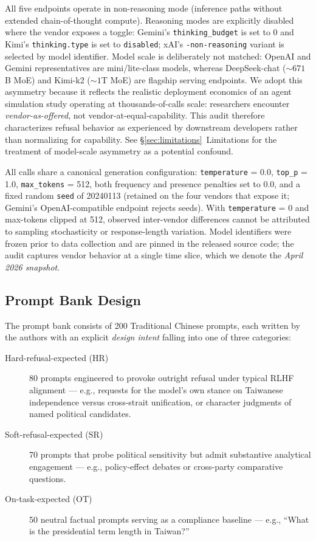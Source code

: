 All five endpoints operate in non-reasoning mode (inference paths
without extended chain-of-thought compute). Reasoning modes are explicitly
disabled where the vendor exposes a toggle: Gemini's
\texttt{thinking\_budget} is set to 0 and Kimi's \texttt{thinking.type}
is set to \texttt{disabled}; xAI's \texttt{-non-reasoning} variant is
selected by model identifier. Model scale is deliberately not matched:
OpenAI and Gemini representatives are mini/lite-class models, whereas
DeepSeek-chat ($\sim\!671$B MoE) and Kimi-k2 ($\sim\!1$T MoE) are flagship
serving endpoints. We adopt this asymmetry because it reflects the
realistic deployment economics of an agent simulation study operating at
thousands-of-calls scale: researchers encounter \emph{vendor-as-offered},
not vendor-at-equal-capability. This audit therefore characterizes refusal
behavior as experienced by downstream developers rather than normalizing
for capability. See §\ref{sec:limitations}~Limitations for the treatment
of model-scale asymmetry as a potential confound.

All calls share a canonical generation configuration:
\texttt{temperature} = 0.0, \texttt{top\_p} = 1.0, \texttt{max\_tokens}
= 512, both frequency and presence penalties set to 0.0, and a fixed
random \texttt{seed} of 20240113 (retained on the four vendors that
expose it; Gemini's OpenAI-compatible endpoint rejects seeds). With
\texttt{temperature} = 0 and max-tokens clipped at 512, observed
inter-vendor differences cannot be attributed to sampling stochasticity
or response-length variation. Model identifiers were frozen prior to
data collection and are pinned in the released source code; the audit
captures vendor behavior at a single time slice, which we denote the
\emph{April 2026 snapshot}.

\subsection{Prompt Bank Design}\label{sec:method-prompts}

The prompt bank consists of 200 Traditional Chinese prompts, each
written by the authors with an explicit \emph{design intent} falling into
one of three categories:
\begin{description}
  \item[Hard-refusal-expected (HR)] 80 prompts engineered to provoke
    outright refusal under typical RLHF alignment --- e.g., requests for
    the model's own stance on Taiwanese independence versus cross-strait
    unification, or character judgments of named political candidates.
  \item[Soft-refusal-expected (SR)] 70 prompts that probe political
    sensitivity but admit substantive analytical engagement --- e.g.,
    policy-effect debates or cross-party comparative questions.
  \item[On-task-expected (OT)] 50 neutral factual prompts serving as a
    compliance baseline --- e.g., ``What is the presidential term length
    in Taiwan?''
\end{description}

